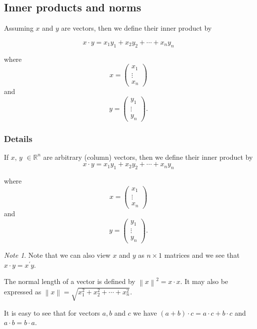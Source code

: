 \documentclass[12pt,a4paper]{article}
\theoremstyle{regla}
\theoremstyle{remark}
\newtheorem{notes}{Note}[section]
\theoremstyle{definition}
\theoremstyle{nonumberbreak}
\begin{document}
\subsection{Inner products and norms}
\begin{fbox}
\begin{minipage}{0.97\textwidth}
Assuming $x$ and $y$ are vectors, then we define their inner product by 

$$x \cdot y = x_1y_1 + x_2y_2 + \cdots + x_ny_n$$

where $$x =\begin{pmatrix}
x_1\\
\vdots\\
x_n
\end{pmatrix}$$
and
$$y= \begin{pmatrix}
y_1\\
\vdots\\
y_n
\end{pmatrix}.$$


\end{minipage}
\end{fbox}
\subsubsection{Details}
If $x$, $y$ $\in \mathbb{R}^n$ are arbitrary (column) vectors, then we define their inner product by
$$x \cdot y = x_1y_1 + x_2y_2 + \cdots + x_ny_n$$

where $$x= \begin{pmatrix}
x_1\\
\vdots\\
x_n
\end{pmatrix}$$
and
$$y =\begin{pmatrix}
y_1\\
\vdots\\
y_n
\end{pmatrix}.$$
\begin{notes}
Note that we can also view $x$ and $y$ as $n \times 1$ matrices and we see that $x \cdot y = x^\prime y$.  
\end{notes}
\begin{defn}
The normal length of a vector is defined by $\left \| x \right \|^2 = x \cdot x$.  It may also be expressed as $\left \| x \right \| = \sqrt{x_1^2 + x_2^2 + \cdots + x_n^2}$. 
\end{defn}
It is easy to see that for vectors $a, b$ and $c$ we have $(a+b)\cdot c=a\cdot c+ b\cdot c$ and $a\cdot b=b\cdot a$.
\end{document}
